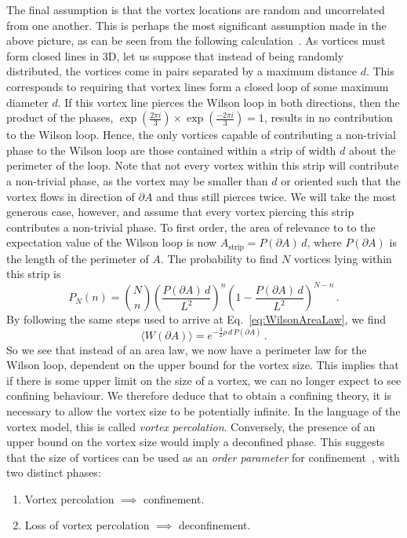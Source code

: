 The final assumption is that the vortex locations are random and uncorrelated from one another. This is perhaps the most significant assumption made in the above picture, as can be seen from the following calculation~\cite{Engelhardt:1999fd}. As vortices must form closed lines in 3D, let us suppose that instead of being randomly distributed, the vortices come in pairs separated by a maximum distance $d$. This corresponds to requiring that vortex lines form a closed loop of some maximum diameter $d$. If this vortex line pierces the Wilson loop in both directions, then the product of the phases, $\exp\left(\frac{2\pi i}{3}\right)\times \exp\left(\frac{-2\pi i}{3}\right) = 1$, results in no contribution to the Wilson loop. Hence, the only vortices capable of contributing a non-trivial phase to the Wilson loop are those contained within a strip of width $d$ about the perimeter of the loop. Note that not every vortex within this strip will contribute a non-trivial phase, as the vortex may be smaller than $d$ or oriented such that the vortex flows in direction of $\partial A$ and thus still pierces twice. We will take the most generous case, however, and assume that every vortex piercing this strip contributes a non-trivial phase. To first order, the area of relevance to to the expectation value of the Wilson loop is now $A_\text{strip}=P(\partial A)\, d$, where $P(\partial A)$ is the length of the perimeter of $A$. The probability to find $N$ vortices lying within this strip is 
%
\begin{equation}
P_N(n) = \binom{N}{n} \left(\frac{P(\partial A)\, d}{L^2}\right)^n \left(1-\frac{P(\partial A)\, d}{L^2}\right)^{N-n}\, .
\end{equation}
%
By following the same steps used to arrive at Eq.~\ref{eq:WilsonAreaLaw}, we find
%
\begin{equation}
\langle W(\partial A)\rangle = e^{-\frac{3}{2}\rho\, d\, P(\partial A)}\, .
\end{equation}
%
So we see that instead of an area law, we now have a perimeter law for the Wilson loop, dependent on the upper bound for the vortex size. This implies that if there is some upper limit on the size of a vortex, we can no longer expect to see confining behaviour. We therefore deduce that to obtain a confining theory, it is necessary to allow the vortex size to be potentially infinite. In the language of the vortex model, this is called \textit{vortex percolation}. Conversely, the presence of an upper bound on the vortex size would imply a deconfined phase. This suggests that the size of vortices can be used as an \textit{order parameter} for confinement~\cite{Langfeld:1998cz}, with two distinct phases:
\begin{enumerate}
\item Vortex percolation $\implies$ confinement.
\item Loss of vortex percolation $\implies$ deconfinement.
\end{enumerate}

